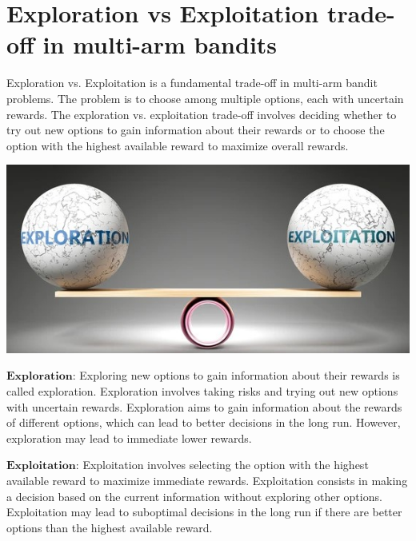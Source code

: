 \documentclass{article}
\begin{document}
\section{Exploration vs Exploitation trade-off in multi-arm bandits}
Exploration vs. Exploitation is a fundamental trade-off in multi-arm bandit problems. The problem is to choose among multiple options, each with uncertain rewards. The exploration vs. exploitation trade-off involves deciding whether to try out new options to gain information about their rewards or to choose the option with the highest available reward to maximize overall rewards.

\begin{center}
    \includegraphics[scale = 0.75]{exploration-exploitation-balance-pictured-balanced-260nw-1586195143 (1).jpg}
\end{center}

$\textbf{Exploration:}$ Exploring new options to gain information about their rewards is called exploration. Exploration involves taking risks and trying out new options with uncertain rewards. Exploration aims to gain information about the rewards of different options, which can lead to better decisions in the long run. However, exploration may lead to immediate lower rewards.

$\textbf{Exploitation:}$ Exploitation involves selecting the option with the highest available reward to maximize immediate rewards. Exploitation consists in making a decision based on the current information without exploring other options. Exploitation may lead to suboptimal decisions in the long run if there are better options than the highest available reward.
\end{document}
